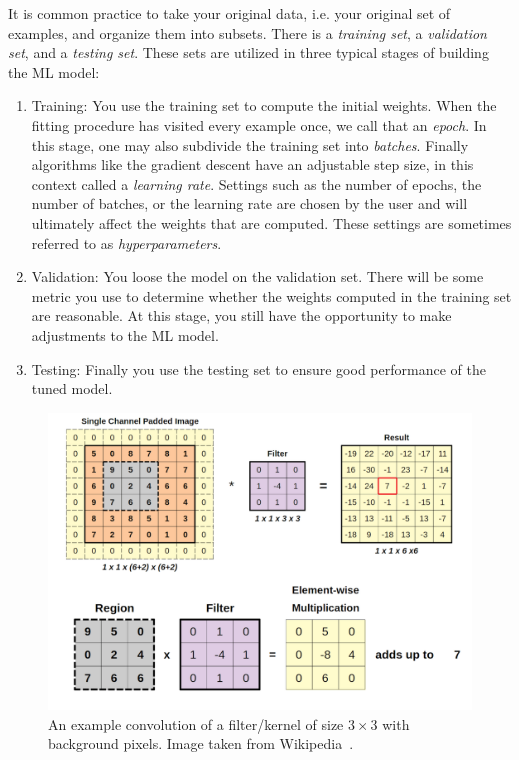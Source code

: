 It is common practice to take your original data, i.e. your original set of
examples, and organize them into subsets. There is a {\it training
set}, a {\it validation set},
and a {\it testing set}. These sets are utilized in three
typical stages of building the ML model:
\begin{enumerate}
\item Training: You use the training set to compute the initial weights.
When the fitting procedure has visited every example once, we call
that an {\it epoch}. In this stage, one may also subdivide
the training set into {\it batches}. Finally algorithms
like the gradient descent have an adjustable step size, in this
context called a {\it learning rate}. Settings such 
as the number of epochs, the number of batches, or the learning rate 
are chosen by the user and will ultimately affect the
weights that are computed. These settings are sometimes referred to
as {\it hyperparameters}.
\item Validation: You loose the model on the 
validation set. There will
be some metric you use to determine whether the weights computed in
the training set are reasonable. At this stage, you still have the opportunity
to make adjustments to the ML model.
\item Testing: Finally you use the testing set to
ensure good performance of the tuned model.
\end{enumerate}


\begin{figure}
\includegraphics[width=\linewidth]{figs/CNN_filter.png}
\caption{An example convolution of a filter/kernel
of size $3\times 3$ with background pixels.
Image taken from Wikipedia~\cite{wikiCNN}.}
\label{fig:CNN}
\end{figure}

